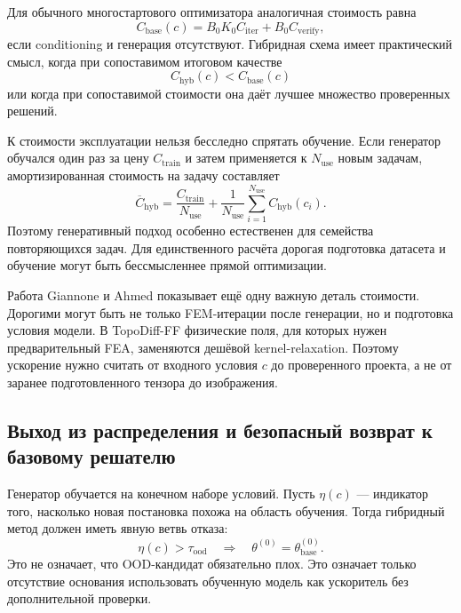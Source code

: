 Для обычного многостартового оптимизатора аналогичная стоимость равна
\begin{equation}
 C_{\mathrm{base}}(c)
 =
 B_0 K_0 C_{\mathrm{iter}}
 +B_0 C_{\mathrm{verify}},
\end{equation}
если conditioning и генерация отсутствуют. Гибридная схема имеет практический смысл, когда при сопоставимом итоговом качестве
\begin{equation}
 C_{\mathrm{hyb}}(c)<C_{\mathrm{base}}(c)
\end{equation}
или когда при сопоставимой стоимости она даёт лучшее множество проверенных решений.

К стоимости эксплуатации нельзя бесследно спрятать обучение. Если генератор обучался один раз за цену $C_{\mathrm{train}}$ и затем применяется к $N_{\mathrm{use}}$ новым задачам, амортизированная стоимость на задачу составляет
\begin{equation}
 \overline C_{\mathrm{hyb}}
 =
 \frac{C_{\mathrm{train}}}{N_{\mathrm{use}}}
 +\frac1{N_{\mathrm{use}}}
 \sum_{i=1}^{N_{\mathrm{use}}}
 C_{\mathrm{hyb}}(c_i).
\end{equation}
Поэтому генеративный подход особенно естественен для семейства повторяющихся задач. Для единственного расчёта дорогая подготовка датасета и обучение могут быть бессмысленнее прямой оптимизации.

Работа Giannone и Ahmed показывает ещё одну важную деталь стоимости. Дорогими могут быть не только FEM-итерации после генерации, но и подготовка условия модели. В TopoDiff-FF физические поля, для которых нужен предварительный FEA, заменяются дешёвой kernel-relaxation. Поэтому ускорение нужно считать от входного условия $c$ до проверенного проекта, а не от заранее подготовленного тензора до изображения.

\subsection{Выход из распределения и безопасный возврат к базовому решателю}

Генератор обучается на конечном наборе условий. Пусть $\eta(c)$ --- индикатор того, насколько новая постановка похожа на область обучения. Тогда гибридный метод должен иметь явную ветвь отказа:
\begin{equation}
 \eta(c)>\tau_{\mathrm{ood}}
 \quad\Longrightarrow\quad
 \theta^{(0)}=\theta_{\mathrm{base}}^{(0)}.
\end{equation}
Это не означает, что OOD-кандидат обязательно плох. Это означает только отсутствие основания использовать обученную модель как ускоритель без дополнительной проверки.

